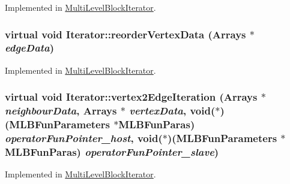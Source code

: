Implemented in \hyperlink{classMultiLevelBlockIterator_af2bc453fc11f9e0ba34a1edc7eafc34e}{MultiLevelBlockIterator}.\hypertarget{classIterator_abe5bcf1a342b1ed4e3a5efe7f630e6d9}{
\subsubsection[{reorderVertexData}]{\setlength{\rightskip}{0pt plus 5cm}virtual void Iterator::reorderVertexData ({\bf Arrays} $\ast$ {\em edgeData})}}
\label{classIterator_abe5bcf1a342b1ed4e3a5efe7f630e6d9}


Implemented in \hyperlink{classMultiLevelBlockIterator_ac442935a4731bb5ae8548bad040ac692}{MultiLevelBlockIterator}.\hypertarget{classIterator_af3f4a8ad925b4a2029d9b2db74787094}{
\subsubsection[{vertex2EdgeIteration}]{\setlength{\rightskip}{0pt plus 5cm}virtual void Iterator::vertex2EdgeIteration ({\bf Arrays} $\ast$ {\em neighbourData}, \/  {\bf Arrays} $\ast$ {\em vertexData}, \/  void($\ast$)({\bf MLBFunParameters} $\ast$MLBFunParas) {\em operatorFunPointer\_\-host}, \/  void($\ast$)({\bf MLBFunParameters} $\ast$MLBFunParas) {\em operatorFunPointer\_\-slave})}}
\label{classIterator_af3f4a8ad925b4a2029d9b2db74787094}


Implemented in \hyperlink{classMultiLevelBlockIterator_ac4035c51b1a940a7661a7e1b15e7b086}{MultiLevelBlockIterator}.

